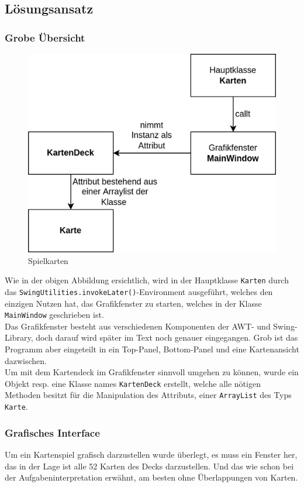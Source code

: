 \documentclass[a4paper,11pt]{article}
\begin{document}
\subsection{Lösungsansatz}

\subsubsection{Grobe Übersicht}
\begin{figure}[H]
    \centering
    \includegraphics[width=.6\textwidth]{media/grober-ansatz.png}
    \caption{Spielkarten}
\end{figure}

Wie in der obigen Abbildung ersichtlich, wird in der Hauptklasse \texttt{Karten} durch das \texttt{SwingUtilities.invokeLater()}-Environment ausgeführt, welches den einzigen Nutzen hat, das Grafikfenster zu starten, welches in der Klasse \texttt{MainWindow} geschrieben ist.\\

Das Grafikfenster besteht aus verschiedenen Komponenten der AWT- und Swing-Library, doch darauf wird später im Text noch genauer eingegangen. Grob ist das Programm aber eingeteilt in ein Top-Panel, Bottom-Panel und eine Kartenansicht dazwischen.\\

Um mit dem Kartendeck im Grafikfenster sinnvoll umgehen zu können, wurde ein Objekt resp. eine Klasse names \texttt{KartenDeck} erstellt, welche alle nötigen Methoden besitzt für die Manipulation des Attributs, einer \texttt{ArrayList} des Typs \texttt{Karte}.

\subsubsection{Grafisches Interface}

Um ein Kartenspiel grafisch darzustellen wurde überlegt, es muss ein Fenster her, das in der Lage ist alle 52 Karten des Decks darzustellen. Und das wie schon bei der Aufgabeninterpretation erwähnt, am besten ohne Überlappungen von Karten.
\end{document}
